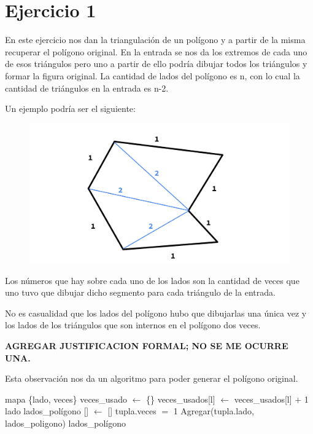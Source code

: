 \section{Ejercicio 1}

En este ejercicio nos dan la triangulación de un polígono y a partir de la misma recuperar el polígono original. En la entrada se nos da los extremos de cada uno de esos triángulos pero uno a partir de ello podría dibujar todos los triángulos y formar la figura original. La cantidad de lados del polígono es n, con lo cual la cantidad de triángulos en la entrada es n-2.\newline

Un ejemplo podría ser el siguiente:\newline

\begin{figure}[h!]
	\centering
	\includegraphics[scale = 0.25]{img/poligono-triangulado.png}
\end{figure}

Los números que hay sobre cada uno de los lados son la cantidad de veces que uno tuvo que dibujar dicho segmento para cada triángulo de la entrada.\newline

No es casualidad que los lados del polígono hubo que dibujarlas una única vez y los lados de los triángulos que son internos en el polígono dos veces.\newline

\textbf{AGREGAR JUSTIFICACION FORMAL; NO SE ME OCURRE UNA.}\newline

Esta observación nos da un algoritmo para poder generar el polígono original.\newline

\begin{algorithmic}

	\State mapa \{lado, veces\} veces_usado $\gets$ \{\}
			\State veces_usados[l] $\gets$ veces_usados[l] + 1
		\EndFor
	\EndFor 
	\State lado lados_polígono [] $\gets$ []
		\If tupla.veces $=$ 1
			\State Agregar(tupla.lado, lados_poligono)
		\EndIf
	\EndFor
	\State \Return lados_polígono
\EndFunction

\end{algorithmic}

